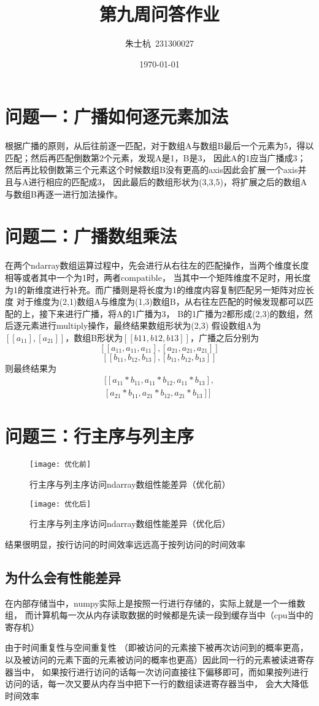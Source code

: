 \documentclass[10pt]{article}
\title{第九周问答作业}
\author{朱士杭\ 231300027}
\date{\kaishu \today}
\begin{document}
	\maketitle
	\section{问题一：广播如何逐元素加法}
	根据广播的原则，从后往前逐一匹配，对于数组A与数组B最后一个元素为5，得以匹配；然后再匹配倒数第2个元素，发现A是1，B是3，
	因此A的1应当广播成3；然后再比较倒数第三个元素这个时候数组B没有更高的axis因此会扩展一个axis并且与A进行相应的匹配成3，
	因此最后的数组形状为(3,3,5)，将扩展之后的数组A与数组B再逐一进行加法操作。
	\section{问题二：广播数组乘法}
	在两个ndarray数组运算过程中，先会进行从右往左的匹配操作，当两个维度长度相等或者其中一个为1时，两者compatible，
	当其中一个矩阵维度不足时，用长度为1的新维度进行补充。而广播则是将长度为1的维度内容复制匹配另一矩阵对应长度
	对于维度为(2,1)数组A与维度为(1,3)数组B，从右往左匹配的时候发现都可以匹配的上，接下来进行广播，将A的1广播为3，
	B的1广播为2都形成(2,3)的数组，然后逐元素进行multiply操作，最终结果数组形状为(2,3)
	假设数组A为$[[a_{11}],[a_{21}]]$，数组B形状为$[[b11,b12,b13]]$，广播之后分别为$$[[a_{11},a_{11},a_{11}],[a_{21},a_{21},a_{21}]]$$
	$$[[b_{11},b_{12},b_{13}],[b_{11},b_{12},b_{13}]]$$则最终结果为
	\begin{equation}
		\begin{aligned}
				[[a_{11}*b_{11},a_{11}*b_{12},a_{11}*b_{13}],\\
			[a_{21}*b_{11},a_{21}*b_{12},a_{21}*b_{13}]]
		\end{aligned}
	\end{equation}
	\section{问题三：行主序与列主序}
	\begin{figure}[H]
		\centering
		\texttt{[image: 优化前]}
		\caption{行主序与列主序访问ndarray数组性能差异（优化前）}
	\end{figure}
	\begin{figure}[H]
		\centering
		\texttt{[image: 优化后]}
		\caption{行主序与列主序访问ndarray数组性能差异（优化后）}
	\end{figure}
	结果很明显，按行访问的时间效率远远高于按列访问的时间效率
	\subsection{为什么会有性能差异}在内部存储当中，numpy实际上是按照一行进行存储的，实际上就是一个一维数组，
	而计算机每一次从内存读取数据的时候都是先读一段到缓存当中（cpu当中的寄存机）\par
	由于时间重复性与空间重复性
	（即被访问的元素接下被再次访问到的概率更高，以及被访问的元素下面的元素被访问的概率也更高）因此同一行的元素被读进寄存器当中，
	如果按行进行访问的话每一次访问直接往下偏移即可，而如果按列进行访问的话，每一次又要从内存当中把下一行的数组读进寄存器当中，
	会大大降低时间效率
	
\end{document}

